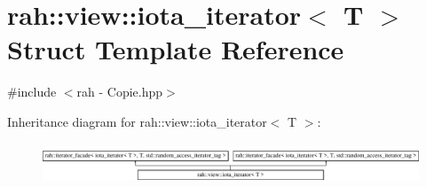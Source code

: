 \hypertarget{structrah_1_1view_1_1iota__iterator}{}\section{rah\+::view\+::iota\+\_\+iterator$<$ T $>$ Struct Template Reference}
\label{structrah_1_1view_1_1iota__iterator}


{\ttfamily \#include $<$rah -\/ Copie.\+hpp$>$}

Inheritance diagram for rah\+::view\+::iota\+\_\+iterator$<$ T $>$\+:\begin{figure}[H]
\begin{center}
\leavevmode
\includegraphics[height=1.217391cm]{structrah_1_1view_1_1iota__iterator}
\end{center}
\end{figure}
